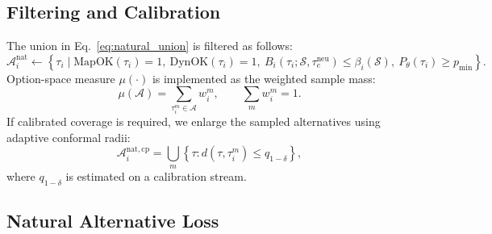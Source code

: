 \documentclass[10pt]{article}
\begin{document}
\subsection{Filtering and Calibration}
\label{app:natural_filtering}

The union in Eq.~\eqref{eq:natural_union} is filtered as follows:
\begin{equation}
    \mathcal{A}^{\mathrm{nat}}_i
    \leftarrow
    \left\{
    \tau_i
    \mid
    \mathrm{MapOK}(\tau_i)=1,\ 
    \mathrm{DynOK}(\tau_i)=1,\ 
    B_i(\tau_i;\mathcal{S},\tau^{\mathrm{neu}}_e)\le \beta_i(\mathcal{S}),\
    P_\theta(\tau_i)\ge p_{\min}
    \right\}.
\end{equation}
Option-space measure $\mu(\cdot)$ is implemented as the weighted sample mass:
\begin{equation}
    \mu(\mathcal{A})
    =
    \sum_{\tau_i^m\in\mathcal{A}} w_i^m,
    \qquad
    \sum_m w_i^m=1 .
\end{equation}
If calibrated coverage is required, we enlarge the sampled alternatives using adaptive conformal radii:
\begin{equation}
    \mathcal{A}^{\mathrm{nat,cp}}_i
    =
    \bigcup_m
    \left\{
    \tau:
    d(\tau,\tau_i^m)\le q_{1-\delta}
    \right\},
\end{equation}
where $q_{1-\delta}$ is estimated on a calibration stream.

\subsection{Natural Alternative Loss}
\label{app:natural_loss}
\end{document}
